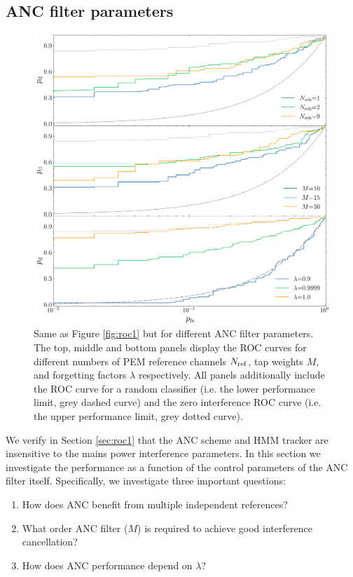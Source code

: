 \documentclass[pra,superscriptaddress,reprint,amsmath,amssymb,nofootinbib]{revtex4-2}
\begin{document}
\subsection{ANC filter parameters} \label{sec:roc2}
\begin{figure}
	\begin{center}
		\includegraphics[width=\columnwidth]{images/roc_curve_filter_params}
	\end{center}
	\caption{Same as Figure \ref{fig:roc1} but for different ANC filter parameters. The top, middle and bottom panels display the ROC curves for different numbers of PEM reference channels $N_{\rm ref}$, tap weights $M$, and forgetting factors $\lambda$ respectively. All panels additionally include the ROC curve for a random classifier (i.e. the lower performance limit, grey dashed curve) and the zero interference ROC curve (i.e. the upper performance limit, grey dotted curve).}
	\label{fig:roc2}
\end{figure}
We verify in Section \ref{sec:roc1} that the ANC scheme and HMM tracker are insensitive to the mains power interference parameters. In this section we investigate the performance as a function of the control parameters of the ANC filter itself. Specifically, we investigate three important questions:
\begin{enumerate}
	\item How does ANC benefit from multiple independent references?
	\item What order ANC filter ($M$) is required to achieve good interference cancellation? 
	\item How does ANC performance depend on $\lambda$?
\end{enumerate} 
\end{document}
